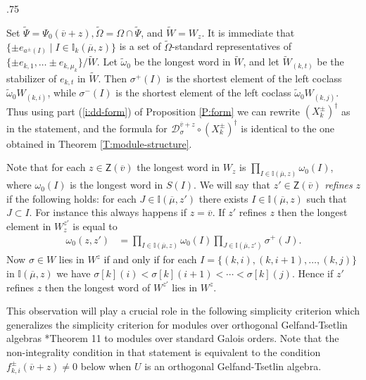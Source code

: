\documentclass[11pt,fleqn]{amsart}
\makeatletter
\renewcommand\proofname{Proof}
\renewenvironment{proof}[1][\textit{\proofname}]{\par
 \pushQED{\qed}%
 \normalfont \topsep.75\paraskip\relax
 \trivlist
 \item[\hskip\labelsep
 \itshape
 #1\@addpunct{.}]\ignorespaces
}{%
 \popQED\endtrivlist\@endpefalse
}
\newcounter{para}[section]
\newcommand\II{\mathbb I}
\newcommand\DD[3]{{}^{#1} \mathcal D_{#2}^{#3}}
\newcommand\Z{\mathsf Z}
\newcommand\vv{\overline{v}}
\makeatother
\begin{document}
\begin{proof}
Set $\widetilde \Psi = \Psi_0(\vv + z), \widetilde \Omega = \Omega \cap 
\widetilde \Psi$, and $\widetilde W = W_z$. It is immediate that 
$\{\pm e_{a^\pm(I)} \mid I \in \II_k(\overline \mu, z)\}$ is a set of 
$\widetilde \Omega$-standard representatives of $\{\pm e_{k,1}, \ldots \pm 
e_{k,\mu_k}\}/\widetilde W$. Let $\widetilde \omega_0$ be the longest word in 
$\widetilde W$, and let $\widetilde W_{(k,t)}$ be the stabilizer of $e_{k,t}$ 
in $\widetilde W$. Then $\sigma^+(I)$ is the shortest element of the left 
coclass $\widetilde \omega_0 W_{(k,i)}$, while $\sigma^-(I)$ is the
shortest element of the left coclass $\widetilde \omega_0 W_{(k,j)}$. Thus 
using part (\ref{i:dd-form}) of Proposition \ref{P:form} we can rewrite 
$(X_k^\pm)^\dagger$ as in the statement, and the formula for 
$\DD{}{\sigma}{\vv + z} \circ (X^\pm_k)^\dagger$ is identical to the one 
obtained in Theorem \ref{T:module-structure}.
\end{proof}

Note that for each $z \in \Z(\vv)$ the longest word in $W_z$ is $\prod_{I \in 
\II(\overline \mu, z)} \omega_0(I)$, where $\omega_0(I)$ is the longest word
in $S(I)$. We will say that $z' \in \Z(\vv)$ \emph{refines} $z$ if the 
following holds: for each $J \in \II (\overline \mu, z')$ there exists $I \in 
\II(\overline \mu, z)$ such that $J \subset I$. For instance this always 
happens if $z = \vv$. If $z'$ refines $z$ then the longest element in 
$W_z^{z'}$ is equal to 
\begin{align*}
\omega_0(z,z')
	&= \prod_{I \in \II(\overline \mu, z)} \omega_0(I) 
		\prod_{J \in \II(\overline \mu, z')} \sigma^+(J).
\end{align*}
Now $\sigma \in W$ lies in $W^z$ if and only if for each $I = \{(k,i), (k,i+1),
\ldots, (k,j)\}$ in $\II(\overline \mu, z)$ we have $\sigma[k](i) < 
\sigma[k](i+1) < \cdots <\sigma[k](j)$. Hence if $z'$ refines $z$
then the longest word of $W^{z'}$ lies in $W^z$. 


This observation will play a crucial role in the following 
simplicity criterion which generalizes the simplicity criterion for modules
over orthogonal Gelfand-Tsetlin algebras \cite{EMV-orthogonal}*{Theorem 11}
to modules over standard Galois orders. Note that the non-integrality 
condition in that statement is equivalent to the condition $f_{k,i}^{\pm}(\vv 
+ z) \neq 0$ below when $U$ is an orthogonal Gelfand-Tsetlin algebra.
\end{document}
